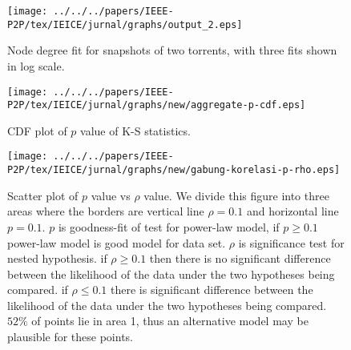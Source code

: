 \begin{figure}[!tb]
\begin{center}
\texttt{[image: ../../../papers/IEEE-P2P/tex/IEICE/jurnal/graphs/output\_2.eps]}
\end{center}
\caption{Node degree fit for snapshots of two torrents, with three fits shown in log scale.} 
\label{fig:fitting}
\end{figure}

\begin{figure}[!tb]
\begin{center}
\texttt{[image: ../../../papers/IEEE-P2P/tex/IEICE/jurnal/graphs/new/aggregate-p-cdf.eps]}
\end{center}
\caption{CDF plot of $p$ value of K-S statistics.} 
\label{fig:cdf-p}
\end{figure}



\begin{figure}[!tb]
\begin{center}
\texttt{[image: ../../../papers/IEEE-P2P/tex/IEICE/jurnal/graphs/new/gabung-korelasi-p-rho.eps]}
\end{center}
\caption{Scatter plot of $p$ value vs $\rho$ value. 
We divide this figure into three areas where the borders are vertical line $\rho =0.1$ and horizontal line $p = 0.1$.
$p$ is goodness-fit of test for power-law model, if $p \geq 0.1$ power-law model is good model for data set. 
$\rho$ is significance test for nested hypothesis. 
if $\rho \ge 0.1$ then there is no significant difference between the likelihood of the data under the two hypotheses being compared.
if $\rho \leq 0.1$ there is significant difference between the likelihood of the data under the two hypotheses being compared.
$52\%$ of points lie in area 1, thus an alternative model may be plausible for these points. 
} 
\label{fig:scatter-pvalue-vs-rho}
\end{figure}

